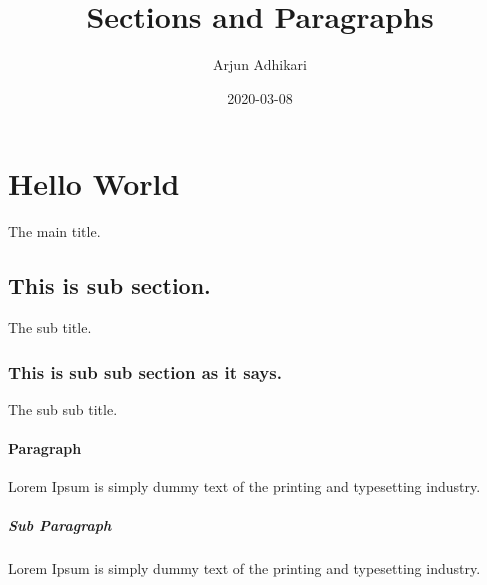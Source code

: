 \documentclass{article}
\title{Sections and Paragraphs}
\author{Arjun Adhikari}
\date{2020-03-08}
\begin{document}
\maketitle
\newpage

\section{Hello World}
The main title.
\subsection{	This is sub section.}
The sub title.
\subsubsection{This is sub sub section as it says.	}
The sub sub title.

\paragraph{Paragraph}
Lorem Ipsum is simply dummy text of the printing and typesetting industry.

\subparagraph{Sub Paragraph}
Lorem Ipsum is simply dummy text of the printing and typesetting industry.
\end{document}
